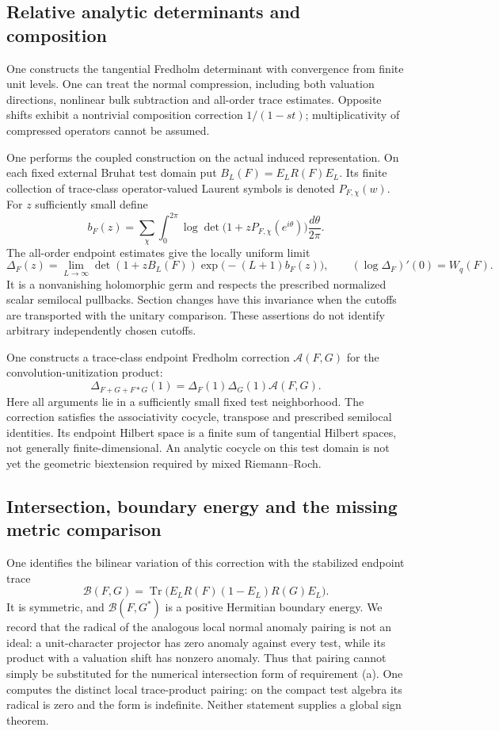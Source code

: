 \documentclass[11pt]{amsart}
\theoremstyle{definition}
\theoremstyle{remark}
\begin{document}
\subsection{Relative analytic determinants and composition}
One constructs the tangential Fredholm determinant with convergence
from finite unit levels. One can treat the normal compression,
including both valuation directions, nonlinear bulk subtraction and
all-order trace estimates. Opposite shifts exhibit a nontrivial
composition correction $1/(1-st)$; multiplicativity of compressed
operators cannot be assumed.

One performs the coupled construction on the actual induced
representation. On each fixed external Bruhat test domain put
$B_L(F)=E_LR(F)E_L$. Its finite collection of trace-class
operator-valued Laurent symbols is denoted $P_{F,\chi}(w)$. For $z$
sufficiently small define
\[
 b_F(z)=\sum_\chi\int_0^{2\pi}
 \log\det\bigl(1+zP_{F,\chi}(e^{i\theta})\bigr)
 \frac{d\theta}{2\pi}.
\]
The all-order endpoint estimates give the locally uniform limit
\[
 \Delta_F(z)=\lim_{L\to\infty}
 \det(1+zB_L(F))\exp\bigl(-(L+1)b_F(z)\bigr),
 \qquad (\log\Delta_F)'(0)=W_q(F).
\]
It is a nonvanishing holomorphic germ and respects the prescribed
normalized scalar semilocal pullbacks. Section changes have this
invariance when the cutoffs are transported with the unitary comparison.
These assertions do not identify arbitrary independently chosen cutoffs.

One constructs a trace-class endpoint Fredholm correction
$\mathcal A(F,G)$ for the convolution-unitization product:
\[
 \Delta_{F+G+F*G}(1)
   =\Delta_F(1)\Delta_G(1)\mathcal A(F,G).
\]
Here all arguments lie in a sufficiently small fixed test neighborhood.
The correction satisfies the associativity cocycle, transpose and
prescribed semilocal identities. Its endpoint Hilbert space is a finite
sum of tangential Hilbert spaces, not generally finite-dimensional.
An analytic cocycle on this test domain is not yet the geometric
biextension required by mixed Riemann--Roch.

\subsection{Intersection, boundary energy and the missing metric comparison}
One identifies the bilinear variation of this correction with the
stabilized endpoint trace
\[
 \mathcal B(F,G)=\operatorname{Tr}
 \bigl(E_LR(F)(1-E_L)R(G)E_L\bigr).
\]
It is symmetric, and $\mathcal B(F,G^*)$ is a positive Hermitian
boundary energy. We record that the radical of the analogous
local normal anomaly pairing is not an ideal: a unit-character
projector has zero anomaly against every test, while its product with
a valuation shift has nonzero anomaly. Thus that pairing cannot simply
be substituted for the numerical intersection form of requirement (a).
One computes the distinct local trace-product pairing: on the
compact test algebra its radical is zero and the form is indefinite.
Neither statement supplies a global sign theorem.
\end{document}
